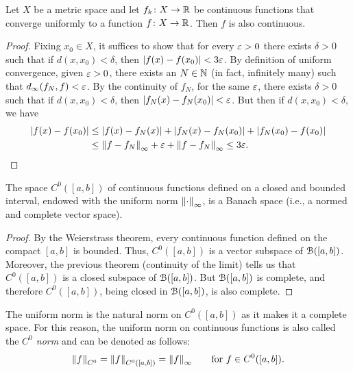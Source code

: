 \begin{theorem}
\mymark{***}%
Let $X$ be a metric space and let $f_k\colon X\to {\mathbb R}$
be continuous functions that
converge uniformly to a function $f\colon X \to {\mathbb R}$. 
Then $f$ is also continuous.
\end{theorem}
%
\begin{proof}
\mymark{***}
Fixing $x_0\in X$, it suffices to show that for every $\varepsilon>0$
there exists $\delta>0$ such that if $d(x,x_0)< \delta$, then ${\left|f(x)-f(x_0)\right|}
< 3 \varepsilon$.
By definition of uniform convergence, given $\varepsilon>0$,
there exists an $N\in {\mathbb N}$ (in fact, infinitely many) such that
$d_\infty(f_N,f)< \varepsilon$. By the continuity of $f_N$, for the same $\varepsilon$, there
exists $\delta>0$
such that if $d(x,x_0) < \delta$, then ${\left|f_N(x)-f_N(x_0)\right|} < \varepsilon$. But then
if $d(x,x_0)<\delta$, we have
\begin{align*}
{\left|f(x)-f(x_0)\right|}
&\le {\left|f(x) - f_N(x)\right|}
 + {\left|f_N(x)-f_N(x_0)\right|}
 + {\left|f_N(x_0) - f(x_0)\right|} \\
 &\le {\left\Vert f-f_N\right\Vert}_\infty + \varepsilon + {\left\Vert f-f_N\right\Vert}_\infty
  \le 3\varepsilon.
\end{align*}
\end{proof}

\begin{theorem}[completeness of $C^0({[a,b]})$]%
\label{th:C0_completo}
\mymark{***}%
%
%
The space $C^0([a,b])$ of continuous functions defined on a closed and bounded
interval,
endowed with the uniform norm ${\left\Vert \cdot\right\Vert}_\infty$, is a Banach space (i.e., a
normed and complete vector space).
\end{theorem}
%
\begin{proof}
By the Weierstrass theorem, every continuous function defined on the compact
$[a,b]$ is bounded.
Thus, $C^0([a,b])$ is a vector subspace of $\mathcal B([a,b])$. 
Moreover, the previous theorem (continuity of the limit) tells us that
$C^0([a,b])$ is a closed subspace of $\mathcal B([a,b])$.
But $\mathcal B([a,b])$ is complete, and therefore $C^0([a,b])$, being closed in
$\mathcal B([a,b])$, is also complete.
\end{proof}

The uniform norm is the natural norm on $C^0([a,b])$ as it makes it a complete
space. For this reason, the uniform norm on continuous functions
is also called the \emph{$C^0$ norm} and can be denoted as follows:
\[
  {\left\Vert f\right\Vert}_{C^0} = {\left\Vert f\right\Vert}_{C^0([a,b])} = {\left\Vert f\right\Vert}_\infty
  \qquad\text{for $f\in C^0([a,b])$.}
\]